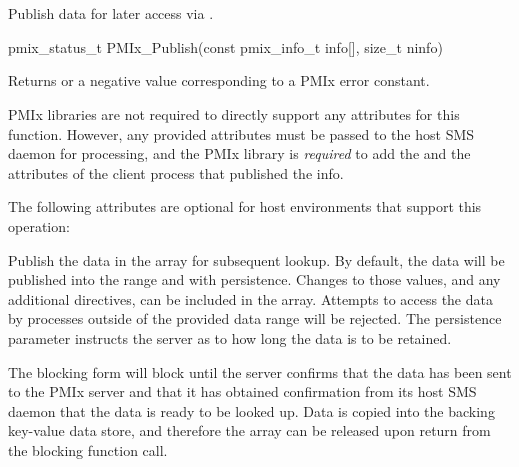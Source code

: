 \section{}

\summary

Publish data for later access via .

\format

\cspecificstart
\begin{codepar}
pmix_status_t
PMIx_Publish(const pmix_info_t info[], size_t ninfo)
\end{codepar}
\cspecificend

\begin{arglist}
\end{arglist}

Returns  or a negative value corresponding to a PMIx error constant.

\reqattrstart
\ac{PMIx} libraries are not required to directly support any attributes for this function. However, any provided attributes must be passed to the host \ac{SMS} daemon for processing, and the \ac{PMIx} library is \textit{required} to add the  and the  attributes of the client process that published the info.

\reqattrend

\optattrstart
The following attributes are optional for host environments that support this operation:


\optattrend

\descr

Publish the data in the  array for subsequent lookup.
By default, the data will be published into the  range and with  persistence.
Changes to those values, and any additional directives, can be included in the  array. Attempts to access the data by processes outside of the provided data range will be rejected. The persistence parameter instructs the server as to how long the data is to be retained.

The blocking form will block until the server confirms that the data has been sent to the \ac{PMIx} server and that it has obtained confirmation from its host \ac{SMS} daemon that the data is ready to be looked up. Data is copied into the backing key-value data store, and therefore the  array can be released upon return from the blocking function call.

